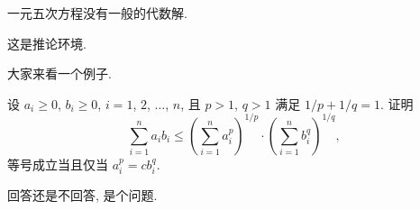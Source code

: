 \begin{theorem}\label{the:theorem1}
一元五次方程没有一般的代数解.
\end{theorem}

\begin{corollary}
这是推论环境.
\end{corollary}

\begin{example}
大家来看一个例子.
\end{example}

\begin{exercise}
设 $a_i\geq0$, $b_i\geq0$, $i=1$, $2$, $\ldots$, $n$, 
且 $p>1$, $q>1$ 满足 $1/p+1/q=1$. 证明
\[
\sum_{i=1}^{n}a_ib_i\leq\left(\sum_{i=1}^{n}a_i^p\right)^{1/p}
\cdot\left(\sum_{i=1}^{n}b_i^q\right)^{1/q},
\]
等号成立当且仅当 $a_i^p=cb_i^q$.
\end{exercise}

\begin{problem}
回答还是不回答, 是个问题. 
\end{problem}